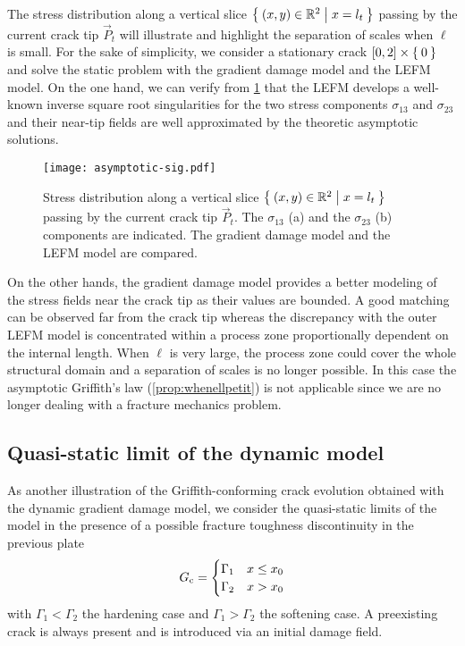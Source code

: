 The stress distribution along a vertical slice $\Set{(x,y)\in\mathbb{R}^2|x=l_t}$ passing by the current crack tip $\vec{P}_t$ will illustrate and highlight the separation of scales when $\ell$ is small. For the sake of simplicity, we consider a stationary crack $[0,2]\times\Set{0}$ and solve the static problem with the gradient damage model and the LEFM model. On the one hand, we can verify from \cref{fig:stress} that the LEFM develops a well-known inverse square root singularities for the two stress components $\sigma_{13}$ and $\sigma_{23}$ and their near-tip fields are well approximated by the theoretic asymptotic solutions.
\begin{figure}[htbp]
\centering
\texttt{[image: asymptotic-sig.pdf]}
\caption{Stress distribution along a vertical slice $\Set{(x,y)\in\mathbb{R}^2|x=l_t}$ passing by the current crack tip $\vec{P}_t$. The $\sigma_{13}$ (a) and the $\sigma_{23}$ (b) components are indicated. The gradient damage model and the LEFM model are compared.} \label{fig:stress}
\end{figure}
On the other hands, the gradient damage model provides a better modeling of the stress fields near the crack tip as their values are bounded. A good matching can be observed far from the crack tip whereas the discrepancy with the outer LEFM model is concentrated within a process zone proportionally dependent on the internal length. When $\ell$ is very large, the process zone could cover the whole structural domain and a separation of scales is no longer possible. In this case the asymptotic Griffith's law (\cref{prop:whenellpetit}) is not applicable since we are no longer dealing with a fracture mechanics problem.

\subsection{Quasi-static limit of the dynamic model}
As another illustration of the Griffith-conforming crack evolution obtained with the dynamic gradient damage model, we consider the quasi-static limits of the model in the presence of a possible fracture toughness discontinuity in the previous plate
\[
G_\mathrm{c}=\begin{cases}
\Gamma_1 & x\leq x_0 \\
\Gamma_2 & x>x_0
\end{cases}
\]
with $\Gamma_1<\Gamma_2$ the hardening case and $\Gamma_1>\Gamma_2$ the softening case. A preexisting crack is always present and is introduced via an initial damage field.


